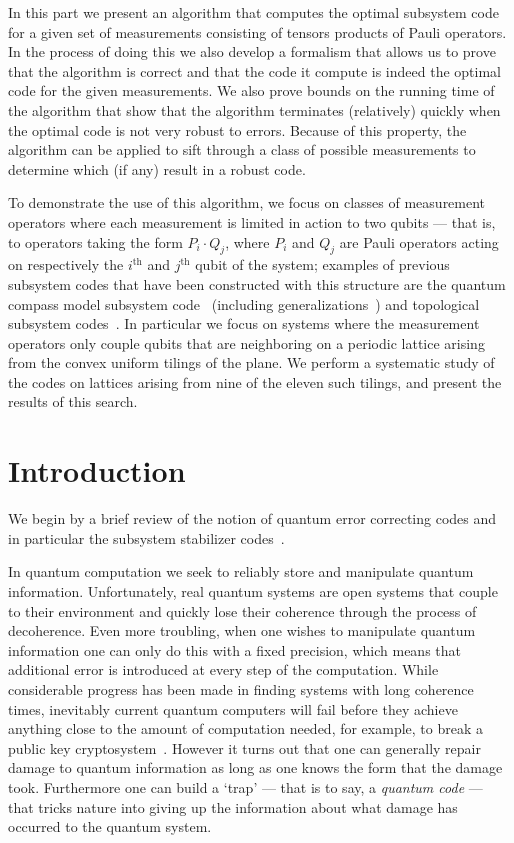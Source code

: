 \documentclass{amsbook}
\theoremstyle{plain}
\theoremstyle{definition}
\theoremstyle{remark}
\begin{document}
In this part we present an algorithm that computes the optimal subsystem code for a given set of measurements consisting of tensors products of Pauli operators.  In the process of doing this we also develop a formalism that allows us to prove that the algorithm is correct and that the code it compute is indeed the optimal code for the given measurements.  We also prove bounds on the running time of the algorithm that show that the algorithm terminates (relatively) quickly when the optimal code is not very robust to errors.  Because of this property, the algorithm can be applied to sift through a class of possible measurements to determine which (if any) result in a robust code.

To demonstrate the use of this algorithm, we focus on classes of measurement operators where each measurement is limited in action to two qubits --- that is, to operators taking the form $P_i \cdot Q_j$, where $P_i$ and $Q_j$ are Pauli operators acting on respectively the $i^{\text{th}}$ and $j^{\text{th}}$ qubit of the system;  examples of previous subsystem codes that have been constructed with this structure are the quantum compass model subsystem code~\cite{Bacon:06a} (including generalizations~\cite{Bacon:06b,Bravyi:10a}) and topological subsystem codes~\cite{Bombin:10a}.  In particular we focus on systems where the measurement operators only couple qubits that are neighboring on a periodic lattice arising from the convex uniform tilings of the plane.  We perform a systematic study of the codes on lattices arising from nine of the eleven such tilings, and present the results of this search.
\chapter{Introduction}

We begin by a brief review of the notion of quantum error correcting codes and in particular the subsystem stabilizer codes~\cite{Poulin:05a}.

In quantum computation we seek to reliably store and manipulate quantum information.  Unfortunately, real quantum systems are open systems that couple to their environment and quickly lose their coherence through the process of decoherence.  Even more troubling, when one wishes to manipulate quantum information one can only do this with a fixed precision, which means that additional error is introduced at every step of the computation.  While considerable progress has been made in finding systems with long coherence times, inevitably current quantum computers will fail before they achieve anything close to the amount of computation needed, for example, to break a public key cryptosystem~\cite{Shor:94a}.  However it turns out that one can generally repair damage to quantum information as long as one knows the form that the damage took.  Furthermore one can build a `trap' --- that is to say, a
\emph{quantum code} --- that tricks nature into giving up the information about what damage has occurred to the quantum system.
\end{document}
